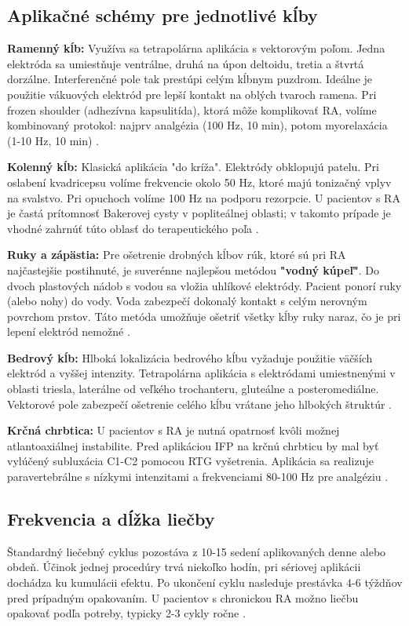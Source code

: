 \subsection{Aplikačné schémy pre jednotlivé kĺby}

\textbf{Ramenný kĺb:}
Využíva sa tetrapolárna aplikácia s vektorovým poľom. Jedna elektróda sa umiestňuje ventrálne, druhá na úpon deltoidu, tretia a štvrtá dorzálne. Interferenčné pole tak prestúpi celým kĺbnym puzdrom. Ideálne je použitie vákuových elektród pre lepší kontakt na oblých tvaroch ramena. Pri frozen shoulder (adhezívna kapsulitída), ktorá môže komplikovať RA, volíme kombinovaný protokol: najprv analgézia (100 Hz, 10 min), potom myorelaxácia (1-10 Hz, 10 min) \parencite{Navratil2019}.

\textbf{Kolenný kĺb:}
Klasická aplikácia "do kríža". Elektródy obklopujú patelu. Pri oslabení kvadricepsu volíme frekvencie okolo 50 Hz, ktoré majú tonizačný vplyv na svalstvo. Pri opuchoch volíme 100 Hz na podporu rezorpcie. U pacientov s RA je častá prítomnosť Bakerovej cysty v popliteálnej oblasti; v takomto prípade je vhodné zahrnúť túto oblasť do terapeutického poľa \parencite{Kolar2012}.

\textbf{Ruky a zápästia:}
Pre ošetrenie drobných kĺbov rúk, ktoré sú pri RA najčastejšie postihnuté, je suverénne najlepšou metódou \textbf{"vodný kúpeľ"}. Do dvoch plastových nádob s vodou sa vložia uhlíkové elektródy. Pacient ponorí ruky (alebo nohy) do vody. Voda zabezpečí dokonalý kontakt s celým nerovným povrchom prstov. Táto metóda umožňuje ošetriť všetky kĺby ruky naraz, čo je pri lepení elektród nemožné \parencite{Navratil2019}.

\textbf{Bedrový kĺb:}
Hlboká lokalizácia bedrového kĺbu vyžaduje použitie väčších elektród a vyššej intenzity. Tetrapolárna aplikácia s elektródami umiestnenými v oblasti triesla, laterálne od veľkého trochanteru, gluteálne a posteromediálne. Vektorové pole zabezpečí ošetrenie celého kĺbu vrátane jeho hlbokých štruktúr \parencite{Robertson2006}.

\textbf{Krčná chrbtica:}
U pacientov s RA je nutná opatrnosť kvôli možnej atlantoaxiálnej instabilite. Pred aplikáciou IFP na krčnú chrbticu by mal byť vylúčený subluxácia C1-C2 pomocou RTG vyšetrenia. Aplikácia sa realizuje paravertebrálne s nízkymi intenzitami a frekvenciami 80-100 Hz pre analgéziu \parencite{Podebradsky2009}.

\subsection{Frekvencia a dĺžka liečby}
Štandardný liečebný cyklus pozostáva z 10-15 sedení aplikovaných denne alebo obdeň. Účinok jednej procedúry trvá niekoľko hodín, pri sériovej aplikácii dochádza ku kumulácii efektu. Po ukončení cyklu nasleduje prestávka 4-6 týždňov pred prípadným opakovaním. U pacientov s chronickou RA možno liečbu opakovať podľa potreby, typicky 2-3 cykly ročne \parencite{Capko2010}.

